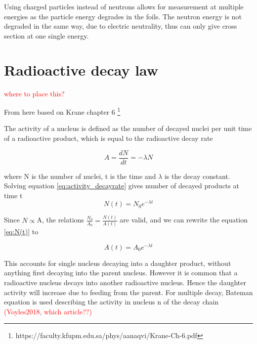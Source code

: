 \documentclass[a4paper,11pt,twoside]{book}
\begin{document}
Using charged particles instead of neutrons allows for measurement at multiple energies as the particle energy degrades in the foils. The neutron energy is not degraded in the same way, due to electric neutrality, thus can only give cross section at one single energy. 


\section{Radioactive decay law}
\textcolor{red}{where to place this? }

From here based on Krane chapter 6 \footnote{https://faculty.kfupm.edu.sa/phys/aanaqvi/Krane-Ch-6.pdf}

The activity of a nucleus is defined as the number of decayed nuclei per unit time of a radioactive product, which is equal to the radioactive decay rate 

\begin{equation} \label{eq:activity_decayrate}
   A =  \frac{dN}{dt}=-\lambda N
\end{equation}

where N is the number of nuclei, t is the time and $\lambda$ is the decay constant. Solving equation \ref{eq:activity_decayrate} gives number of decayed products at time t
\begin{equation} \label{eq:N(t)}
    N(t) = N_0 e^{-\lambda t}
\end{equation}

\noindent 
Since $N\propto$A, the relations $\frac{N_0}{A_0}=\frac{N(t)}{A(t)}$ are valid, and we can rewrite the equation \ref{eq:N(t)} to

\begin{equation} \label{eq:activity_decaylaw}
    A(t) = A_0 e^{-\lambda t}
\end{equation}


This accounts for single nucleus decaying into a daughter product, without anything first decaying into the parent nucleus. However it is common that a radioactive nucleus decays into another radioactive nucleus. Hence the daughter activity will increase due to feeding from the parent.
For multiple decay, Bateman equation is used describing the activity in nucleus n of the decay chain \textcolor{red}{(Voyles2018, which article??)}
\end{document}
